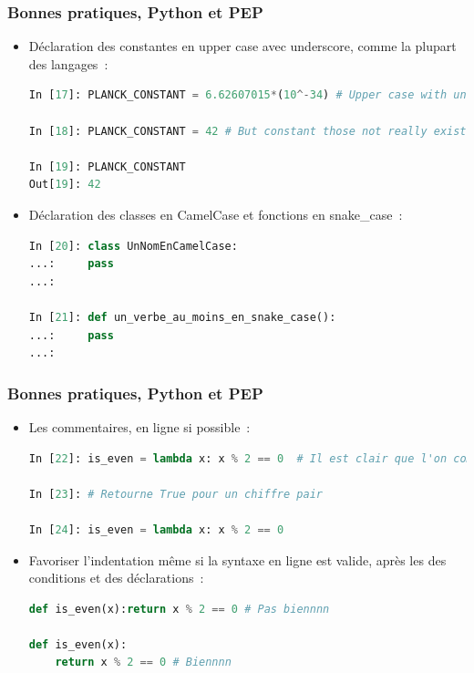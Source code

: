 \documentclass{beamer}
\begin{document}
    \begin{frame}[fragile]
        \transdissolve
        \frametitle{Bonnes pratiques, Python et PEP}
        \begin{itemize}
            \item Déclaration des constantes en upper case avec underscore, comme la plupart des langages~:
            \begin{lstlisting}[language=python]
In [17]: PLANCK_CONSTANT = 6.62607015*(10^-34) # Upper case with underscore for constants

In [18]: PLANCK_CONSTANT = 42 # But constant those not really exists in Python

In [19]: PLANCK_CONSTANT
Out[19]: 42
            \end{lstlisting}
            \item Déclaration des classes en CamelCase et fonctions en snake\_case~:
            \begin{lstlisting}[language=python]
In [20]: class UnNomEnCamelCase:
...:     pass
...:

In [21]: def un_verbe_au_moins_en_snake_case():
...:     pass
...:
            \end{lstlisting}
        \end{itemize}

    \end{frame}

    \begin{frame}[fragile]
        \transdissolve
        \frametitle{Bonnes pratiques, Python et PEP}
        \begin{itemize}
            \item Les commentaires, en ligne si possible~:
            \begin{lstlisting}[language=python]
In [22]: is_even = lambda x: x % 2 == 0  # Il est clair que l'on commente cette ligne mais c'est long

In [23]: # Retourne True pour un chiffre pair

In [24]: is_even = lambda x: x % 2 == 0
            \end{lstlisting}
            \item Favoriser l'indentation même si la syntaxe en ligne est valide, après les \textquote{:} des conditions et des déclarations~:
            \begin{lstlisting}[language=python]
def is_even(x):return x % 2 == 0 # Pas biennnn

def is_even(x):
    return x % 2 == 0 # Biennnn
            \end{lstlisting}
        \end{itemize}

    \end{frame}
\end{document}
